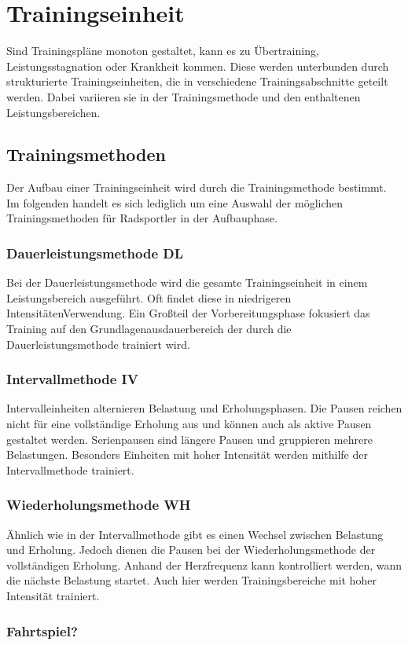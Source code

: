 \section{Trainingseinheit}
\label{grundlagen:einheiten}
Sind Trainingspläne monoton gestaltet, kann es zu Übertraining, Leistungsstagnation oder Krankheit kommen. Diese werden unterbunden durch strukturierte Trainingseinheiten, die in verschiedene Trainingsabschnitte geteilt werden. Dabei variieren sie in der Trainingsmethode und den enthaltenen Leistungsbereichen.
\subsection{Trainingsmethoden}
\label{grundlagen:methoden}
    Der Aufbau einer Trainingseinheit wird durch die Trainingsmethode bestimmt. Im folgenden handelt es sich lediglich um eine Auswahl der möglichen Trainingsmethoden für Radsportler in der Aufbauphase. \cite[40-43]{Radsporttraining} 
    \subsubsection{Dauerleistungsmethode DL}
    Bei der Dauerleistungsmethode wird die gesamte Trainingseinheit in einem Leistungsbereich ausgeführt. Oft findet diese in niedrigeren IntensitätenVerwendung. Ein Großteil der Vorbereitungsphase fokusiert das Training auf den Grundlagenausdauerbereich der durch die Dauerleistungsmethode trainiert wird.
    \subsubsection{Intervallmethode IV}
    Intervalleinheiten alternieren Belastung und Erholungsphasen. Die Pausen reichen nicht für eine vollständige Erholung aus und können auch als aktive Pausen gestaltet werden. Serienpausen sind längere Pausen und gruppieren mehrere Belastungen. Besonders Einheiten mit hoher Intensität werden mithilfe der Intervallmethode trainiert. 
    \subsubsection{Wiederholungsmethode WH}
    Ähnlich wie in der Intervallmethode gibt es einen Wechsel zwischen Belastung und Erholung. Jedoch dienen die Pausen bei der Wiederholungsmethode der vollständigen Erholung. Anhand der Herzfrequenz kann kontrolliert werden, wann die nächste Belastung startet. Auch hier werden Trainingsbereiche mit hoher Intensität trainiert.
    \subsubsection{Fahrtspiel?}
